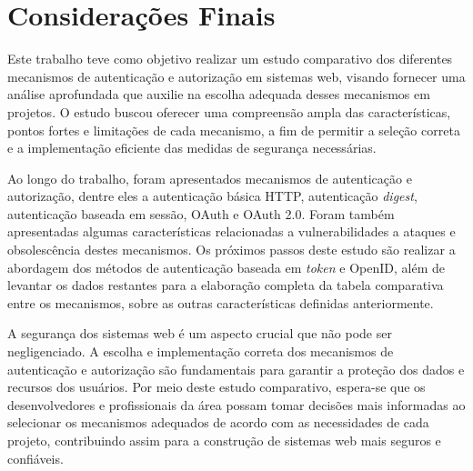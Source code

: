 \section{Considerações Finais}

Este trabalho teve como objetivo realizar um estudo comparativo dos diferentes mecanismos de 
autenticação e autorização em sistemas web, visando fornecer uma análise aprofundada que auxilie na 
escolha adequada desses mecanismos em projetos. O estudo buscou oferecer uma compreensão ampla das 
características, pontos fortes e limitações de cada mecanismo, a fim de permitir a seleção correta 
e a implementação eficiente das medidas de segurança necessárias.

Ao longo do trabalho, foram apresentados mecanismos de autenticação e autorização, dentre eles a 
autenticação básica HTTP, autenticação \emph{digest}, autenticação baseada em sessão, OAuth e OAuth 2.0.
Foram também apresentadas algumas características relacionadas a vulnerabilidades a ataques e 
obsolescência destes mecanismos. Os próximos passos deste estudo são realizar a abordagem dos 
métodos de autenticação baseada em \emph{token} e OpenID, além de levantar os dados restantes para 
a elaboração completa da tabela comparativa entre os mecanismos, sobre as outras características 
definidas anteriormente.

A segurança dos sistemas web é um aspecto crucial que não pode ser negligenciado. A escolha e 
implementação correta dos mecanismos de autenticação e autorização são fundamentais para garantir 
a proteção dos dados e recursos dos usuários. Por meio deste estudo comparativo, espera-se que os 
desenvolvedores e profissionais da área possam tomar decisões mais informadas ao selecionar os 
mecanismos adequados de acordo com as necessidades de cada projeto, contribuindo assim para a 
construção de sistemas web mais seguros e confiáveis.